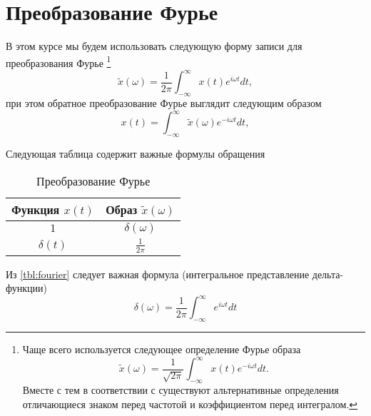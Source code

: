 \section{Преобразование Фурье}
\label{sec:cont_fourier}
В этом курсе мы будем использовать следующую форму записи для
преобразования Фурье
\footnote{
Чаще всего используется следующее определение Фурье образа
\[
\tilde{x}\left(\omega\right) = \frac{1}{\sqrt{2 \pi}}
\int_{-\infty}^{\infty}x\left(t\right)e^{-i \omega t}dt.
\]
Вместе с тем в соответствии с \cite{wiki:fourier_transform} существуют
альтернативные определения отличающиеся знаком перед частотой и
коэффициентом перед интегралом.}
\begin{equation}
\tilde{x}\left(\omega\right) = \frac{1}{2 \pi}
\int_{-\infty}^{\infty}x\left(t\right)e^{i \omega t}dt,
\label{eq:direct_fourier}
\end{equation}
при этом обратное преобразование Фурье выглядит следующим образом
\begin{equation}
x\left(t\right) =
\int_{-\infty}^{\infty}\tilde{x}\left(\omega\right)e^{-i \omega t}dt, 
\label{eq:reverse_fourier}
\end{equation}

Следующая таблица содержит важные формулы обращения
\begin{table}[H]
\centering
\begin{tabular}{|c|c|}
\hline
Функция $x\left(t\right)$ &  Образ $\tilde{x}\left(\omega\right)$\\ \hline
$1$  & $\delta\left(\omega\right)$ \\
$\delta\left(t\right)$  & $\frac{1}{2 \pi}$  \\
\hline
\end{tabular}
\caption{Преобразование Фурье}
\label{tbl:fourier}
\end{table}

Из \autoref{tbl:fourier} следует важная формула (интегральное
представление дельта-функции) \cite{wiki:deltafunction}
\begin{equation}
\delta\left(\omega\right) = \frac{1}{2 \pi} \int_{-\infty}^{\infty}
e^{i \omega t} dt
\label{eq:delta_from_integral}
\end{equation}

